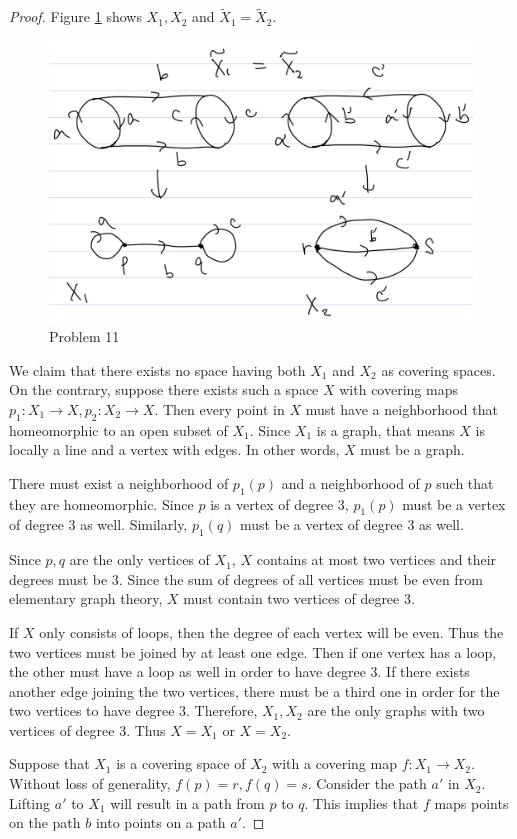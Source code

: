 \documentclass[12pt, psamsfonts]{amsart}
\theoremstyle{definition}
\theoremstyle{remark}
\numberwithin{equation}{section}
\begin{document}
\begin{proof}
  Figure \ref{fig:problem11} shows $X_1, X_2$ and $\tilde{X}_1 = \tilde{X}_2$.
  \begin{figure}
    \includegraphics[width=.5\linewidth]{problem11.jpeg}
    \caption{Problem 11}
    \label{fig:problem11}
  \end{figure}
  
  We claim that there exists no space having both $X_1$ and $X_2$ as covering spaces.
  On the contrary, suppose there exists such a space $X$ with covering maps $p_1: X_1 \rightarrow X, p_2: X_2 \rightarrow X$.
  Then every point in $X$ must have a neighborhood that homeomorphic to an open subset of $X_1$.
  Since $X_1$ is a graph, that means $X$ is locally a line and a vertex with edges.
  In other words, $X$ must be a graph.

  There must exist a neighborhood of $p_1(p)$ and a neighborhood of $p$ such that they are homeomorphic.
  Since $p$ is a vertex of degree 3, $p_1(p)$ must be a vertex of degree 3 as well.
  Similarly, $p_1(q)$ must be a vertex of degree 3 as well.

  Since $p, q$ are the only vertices of $X_1$, $X$ contains at most two vertices and their degrees must be 3.
  Since the sum of degrees of all vertices must be even from elementary graph theory, $X$ must contain two vertices of degree 3.

  If $X$ only consists of loops, then the degree of each vertex will be even.
  Thus the two vertices must be joined by at least one edge.
  Then if one vertex has a loop, the other must have a loop as well in order to have degree 3.
  If there exists another edge joining the two vertices, there must be a third one in order for the two vertices to have degree 3.
  Therefore, $X_1, X_2$ are the only graphs with two vertices of degree 3.
  Thus $X = X_1$ or $X = X_2$.

  Suppose that $X_1$ is a covering space of $X_2$ with a covering map $f: X_1 \rightarrow X_2$.
  Without loss of generality, $f(p) = r, f(q) = s$.
  Consider the path $a'$ in $X_2$.
  Lifting $a'$ to $X_1$ will result in a path from $p$ to $q$.
  This implies that $f$ maps points on the path $b$ into points on a path $a'$.
  

\end{proof}
\end{document}
